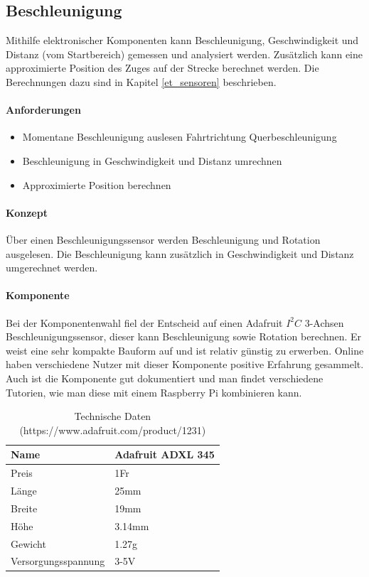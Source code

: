 \documentclass[../../main.tex]{subfiles}
\begin{document}
\subsection{Beschleunigung} \label{pi_beschleunigung}
Mithilfe elektronischer Komponenten kann Beschleunigung, Geschwindigkeit und Distanz (vom Startbereich) gemessen und analysiert werden. Zusätzlich kann eine approximierte Position des Zuges auf der Strecke berechnet werden. Die Berechnungen dazu sind in Kapitel \ref{et_sensoren} beschrieben.

\paragraph{Anforderungen}
\begin{itemize}
    \item Momentane Beschleunigung auslesen
      \subitem Fahrtrichtung
      \subitem Querbeschleunigung
    \item Beschleunigung in Geschwindigkeit und Distanz umrechnen
    \item Approximierte Position berechnen
\end{itemize}

\paragraph{Konzept}
Über einen Beschleunigungssensor werden Beschleunigung und Rotation ausgelesen. Die Beschleunigung kann zusätzlich in Geschwindigkeit und Distanz umgerechnet werden.

\paragraph{Komponente}
Bei der Komponentenwahl fiel der Entscheid auf einen Adafruit $I^2C$ 3-Achsen Beschleunigungssensor, dieser kann Beschleunigung sowie Rotation berechnen. Er weist eine sehr kompakte Bauform auf und ist relativ günstig zu erwerben. Online haben verschiedene Nutzer mit dieser Komponente positive Erfahrung gesammelt. Auch ist die Komponente gut dokumentiert und man findet verschiedene Tutorien, wie man diese mit einem Raspberry Pi kombinieren kann.

\begin{table}[H]
\begin{center}
\begin{tabular}{ll}
Name & Adafruit ADXL 345  \\ \hline
Preis & 1Fr               \\ \hline
Länge & 25mm              \\ \hline
Breite & 19mm             \\ \hline
Höhe & 3.14mm             \\ \hline
Gewicht & 1.27g           \\ \hline
Versorgungsspannung & 3-5V \\ \hline
\end{tabular}
\caption {Technische Daten (https://www.adafruit.com/product/1231)}
\end{center}
\end{table}
\end{document}
